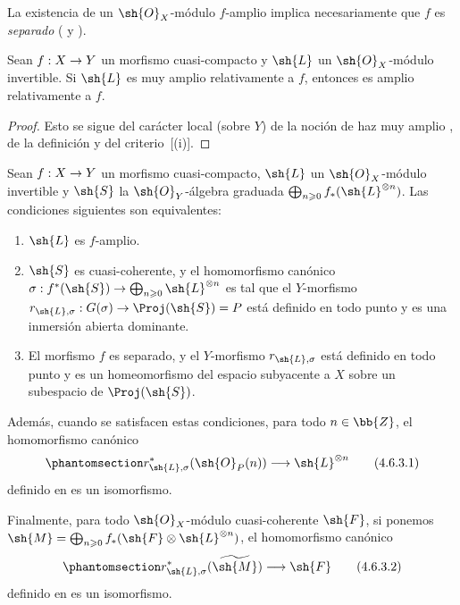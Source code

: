 \documentclass[oneside,10pt]{amsart}
\makeatletter
\renewcommand{\geq}{\geqslant}
\newcommand{\ega@arrow}[2]{\mathchoice{#1}{#2}{#2}{#2}}
\renewcommand{\to}{\ega@arrow{\longrightarrow}{\rightarrow}}
\let\EGAOriginalLabel\label
\renewcommand{\label}[1]{\phantomsection\EGAOriginalLabel{#1}}
\makeatother
\begin{document}
La existencia de un $\sh{O}_X$-módulo $f$-amplio implica necesariamente que $f$ es \emph{separado} ( y ).

\begin{proposition}[4.6.2]
\label{II.4.6.2}
Sean $f:X\to Y$ un morfismo cuasi-compacto y $\sh{L}$ un $\sh{O}_X$-módulo invertible.
Si $\sh{L}$ es muy amplio relativamente a $f$, entonces es amplio relativamente a $f$.
\end{proposition}

\begin{proof}
Esto se sigue del carácter local (sobre $Y$) de la noción de haz muy amplio , de la definición  y del criterio~[(i)].
\end{proof}

\begin{proposition}[4.6.3]
\label{II.4.6.3}
Sean $f:X\to Y$ un morfismo cuasi-compacto, $\sh{L}$ un $\sh{O}_X$-módulo invertible y $\sh{S}$ la $\sh{O}_Y$-álgebra graduada $\bigoplus_{n\geq0}f_*(\sh{L}^{\otimes n})$.
Las condiciones siguientes son equivalentes:
\begin{enumerate}
  \item[\rm{(a)}] $\sh{L}$ es $f$-amplio.
  \item[\rm{(b)}] $\sh{S}$ es cuasi-coherente, y el homomorfismo canónico $\sigma:f^*(\sh{S})\to\bigoplus_{n\geq0}\sh{L}^{\otimes n}$  es tal que el $Y$-morfismo $r_{\sh{L},\sigma}:G(\sigma)\to\Proj(\sh{S})=P$ está definido en todo punto y es una inmersión abierta dominante.
  \item[\rm{(b')}] El morfismo $f$ es separado, y el $Y$-morfismo $r_{\sh{L},\sigma}$ está definido en todo punto y es un homeomorfismo del espacio subyacente a $X$ sobre un subespacio de $\Proj(\sh{S})$.
\end{enumerate}

Además, cuando se satisfacen estas condiciones, para todo $n\in\bb{Z}$, el homomorfismo canónico
\[
\label{II.4.6.3.1}
  r_{\sh{L},\sigma}^*(\sh{O}_P(n))\to\sh{L}^{\otimes n}
\tag{4.6.3.1}
\]
definido en  es un isomorfismo.

Finalmente, para todo $\sh{O}_X$-módulo cuasi-coherente $\sh{F}$, si ponemos $\sh{M}=\bigoplus_{n\geq0}f_*(\sh{F}\otimes\sh{L}^{\otimes n})$, el homomorfismo canónico
\[
\label{II.4.6.3.2}
  r_{\sh{L},\sigma}^*(\widetilde{\sh{M}})\to\sh{F}
\tag{4.6.3.2}
\]
definido en  es un isomorfismo.
\end{proposition}
\end{document}
